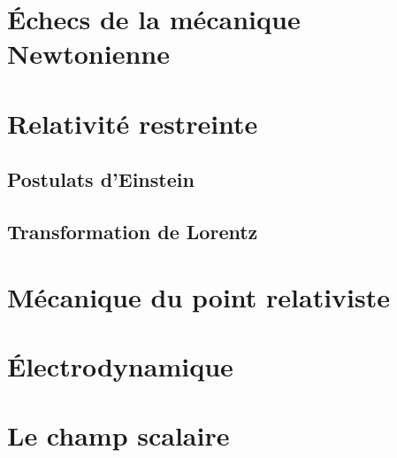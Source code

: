 \section{Échecs de la mécanique Newtonienne}

\section{Relativité restreinte}
\subsection{Postulats d'Einstein}
\subsection{Transformation de Lorentz}

\section{Mécanique du point relativiste}

\section{Électrodynamique}

\section{Le champ scalaire}
